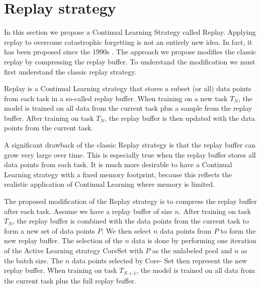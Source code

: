 \section{Replay strategy}
\label{sec:Methodology:ReplayStrategy}
In this section we propose a Continual Learning Strategy called Replay. Applying replay to overcome catastrophic forgetting is not an entirely new idea. In fact, it
has been proposed since the 1990s \cite{robins1995catastrophic}. The approach we propose modifies the classic replay by compressing the replay buffer. To understand the modification
we must first understand the classic replay strategy. \par
Replay is a Continual Learning strategy that stores a subset (or all) data points from each task in a so-called replay buffer. When training on a new task $T_N$, the model is trained 
on all data from the current task plus a sample from the replay buffer. After training on task $T_N$, the replay buffer is then updated with the data points from the current task. \par
A significant drawback of the classic Replay strategy is that the replay buffer can grow very large over time. This is especially true when the replay buffer stores all data points from
each task. It is much more desirable to have a Continual Learning strategy with a fixed memory footprint, because this reflects the realistic application of Continual Learning where memory 
is limited. \par
The proposed modification of the Replay strategy is to compress the replay buffer after each task. Assume we have a replay buffer of size $n$. After training on task $T_N$, the replay buffer
is combined with the data points from the current task to form a new set of data points $P$. We then select $n$ data points from $P$ to form the new replay buffer. The selection of the $n$ data
is done by performing one iteration of the Active Learning strategy CoreSet \cite{sener2018active} with $P$ as the unlabeled pool and $n$ as the batch size. The $n$ data points selected by Core-
Set then represent the new replay buffer. When training on task $T_{N+1}$, the model is trained on all data from the current task plus the full replay buffer.

